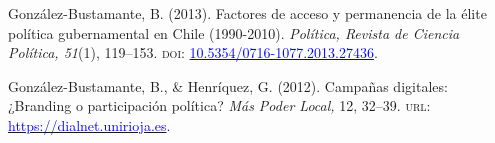 \begin{publications}
\begin{benumerate}{14}
\item{\small González-Bustamante, B. (2013). Factores de acceso y permanencia de la élite política gubernamental en Chile (1990-2010). {\itshape Política, Revista de Ciencia Política, 51}(1), 119--153. {\scshape doi}: \href{https://doi.org/10.5354/0716-1077.2013.27436}{\textcolor{blue}{10.5354/0716-1077.2013.27436}}.} \vspace{1mm} %


\item{\small González-Bustamante, B., \& Henríquez, G. (2012). Campañas digitales: ¿Branding o participación política? {\itshape Más Poder Local,} 12, 32--39. {\scshape url:} \href{https://dialnet.unirioja.es/servlet/articulo?codigo=4013864}{\textcolor{blue}{https://dialnet.unirioja.es}}.} \vspace{1mm} %

\end{benumerate}

\end{publications}
